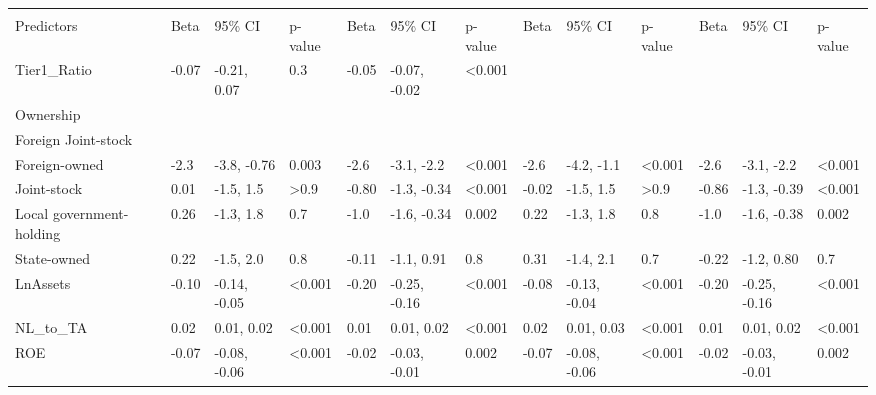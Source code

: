 \documentclass{article}
\begin{document}
\begingroup\fontsize{6}{8}\selectfont

\begin{tabu} to 
\hline
{} &  &  &  &  \\
   
Predictors & Beta & 95\% CI & p-value & Beta & 95\% CI & p-value & Beta & 95\% CI & p-value & Beta & 95\% CI & p-value\\
\hline
Tier1\_Ratio & -0.07 & -0.21, 0.07 & 0.3 & -0.05 & -0.07, -0.02 & <0.001 &  &  &  &  &  & \\
\hline
Ownership &  &  &  &  &  &  &  &  &  &  &  & \\
\hline
\hspace{1em}Foreign Joint-stock &  &  &  &  &  &  &  &  &  &  &  & \\
\hline
\hspace{1em}Foreign-owned & -2.3 & -3.8, -0.76 & 0.003 & -2.6 & -3.1, -2.2 & <0.001 & -2.6 & -4.2, -1.1 & <0.001 & -2.6 & -3.1, -2.2 & <0.001\\
\hline
\hspace{1em}Joint-stock & 0.01 & -1.5, 1.5 & >0.9 & -0.80 & -1.3, -0.34 & <0.001 & -0.02 & -1.5, 1.5 & >0.9 & -0.86 & -1.3, -0.39 & <0.001\\
\hline
\hspace{1em}Local government-holding & 0.26 & -1.3, 1.8 & 0.7 & -1.0 & -1.6, -0.34 & 0.002 & 0.22 & -1.3, 1.8 & 0.8 & -1.0 & -1.6, -0.38 & 0.002\\
\hline
\hspace{1em}State-owned & 0.22 & -1.5, 2.0 & 0.8 & -0.11 & -1.1, 0.91 & 0.8 & 0.31 & -1.4, 2.1 & 0.7 & -0.22 & -1.2, 0.80 & 0.7\\
\hline
LnAssets & -0.10 & -0.14, -0.05 & <0.001 & -0.20 & -0.25, -0.16 & <0.001 & -0.08 & -0.13, -0.04 & <0.001 & -0.20 & -0.25, -0.16 & <0.001\\
\hline
NL\_to\_TA & 0.02 & 0.01, 0.02 & <0.001 & 0.01 & 0.01, 0.02 & <0.001 & 0.02 & 0.01, 0.03 & <0.001 & 0.01 & 0.01, 0.02 & <0.001\\
\hline
ROE & -0.07 & -0.08, -0.06 & <0.001 & -0.02 & -0.03, -0.01 & 0.002 & -0.07 & -0.08, -0.06 & <0.001 & -0.02 & -0.03, -0.01 & 0.002\\

\end{tabu}
\end{document}
